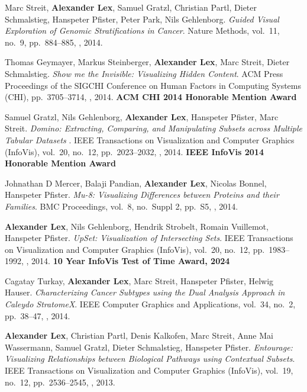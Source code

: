 \item Marc Streit, \textbf{Alexander Lex}, Samuel Gratzl, Christian Partl, Dieter Schmalstieg, Hanspeter Pfister, Peter Park, Nils Gehlenborg. \textit{Guided Visual Exploration of Genomic Stratifications in Cancer}. Nature Methods, vol.\ 11, no.\ 9, pp.\ 884--885, , 2014. 
\item Thomas Geymayer, Markus Steinberger, \textbf{Alexander Lex}, Marc Streit, Dieter Schmalstieg. \textit{Show me the Invisible: Visualizing Hidden Content}. ACM Press Proceedings of the SIGCHI Conference on Human Factors in Computing Systems (CHI), pp.\ 3705--3714, , 2014. \textbf{ACM CHI 2014 Honorable Mention Award}
\item Samuel Gratzl, Nils Gehlenborg, \textbf{Alexander Lex}, Hanspeter Pfister, Marc Streit. \textit{Domino: Extracting, Comparing, and Manipulating Subsets across Multiple Tabular Datasets }. IEEE Transactions on Visualization and Computer Graphics (InfoVis), vol.\ 20, no.\ 12, pp.\ 2023--2032, , 2014. \textbf{IEEE InfoVis 2014 Honorable Mention Award}
\item Johnathan D Mercer, Balaji Pandian, \textbf{Alexander Lex}, Nicolas Bonnel, Hanspeter Pfister. \textit{Mu-8: Visualizing Differences between Proteins and their Families}. BMC Proceedings, vol.\ 8, no.\ Suppl 2, pp.\ S5, , 2014. 
\item \textbf{Alexander Lex}, Nils Gehlenborg, Hendrik Strobelt, Romain Vuillemot, Hanspeter Pfister. \textit{UpSet: Visualization of Intersecting Sets}. IEEE Transactions on Visualization and Computer Graphics (InfoVis), vol.\ 20, no.\ 12, pp.\ 1983--1992, , 2014. \textbf{10 Year InfoVis Test of Time Award, 2024}
\item Cagatay Turkay, \textbf{Alexander Lex}, Marc Streit, Hanspeter Pfister, Helwig Hauser. \textit{Characterizing Cancer Subtypes using the Dual Analysis Approach in Caleydo StratomeX}. IEEE Computer Graphics and Applications, vol.\ 34, no.\ 2, pp.\ 38--47, , 2014. 
\item \textbf{Alexander Lex}, Christian Partl, Denis Kalkofen, Marc Streit, Anne Mai Wassermann, Samuel Gratzl, Dieter Schmalstieg, Hanspeter Pfister. \textit{Entourage: Visualizing Relationships between Biological Pathways using Contextual Subsets}. IEEE Transactions on Visualization and Computer Graphics (InfoVis), vol.\ 19, no.\ 12, pp.\ 2536--2545, , 2013. 
